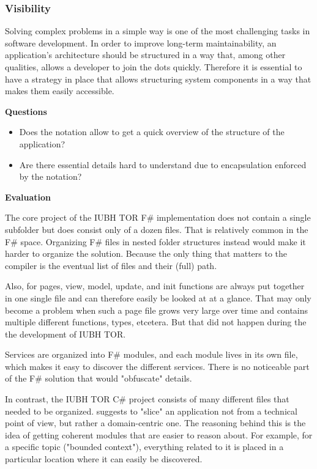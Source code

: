 \subsubsection{Visibility}

Solving complex problems in a simple way is one of the most challenging tasks in software development. In order to improve long-term maintainability, an application's architecture should be structured in a way that, among other qualities, allows a developer to join the dots quickly. Therefore it is essential to have a strategy in place that allows structuring system components in a way that makes them easily accessible.

\textbf{Questions}

\begin{itemize}
\item Does the notation allow to get a quick overview of the structure of the application?
\item Are there essential details hard to understand due to encapsulation enforced by the notation?
\end{itemize}

\textbf{Evaluation}

The core project of the IUBH TOR F\# implementation does not contain a single subfolder but does consist only of a dozen files. That is relatively common in the F\# space. Organizing F\# files in nested folder structures instead would make it harder to organize the solution. Because the only thing that matters to the compiler is the eventual list of files and their (full) path.

Also, for pages, view, model, update, and init functions are always put together in one single file and can therefore easily be looked at at a glance. That may only become a problem when such a page file grows very large over time and contains multiple different functions, types, etcetera. But that did not happen during the the development of IUBH TOR.

Services are organized into F\# modules, and each module lives in its own file, which makes it easy to discover the different services. There is no noticeable part of the F\# solution that would "obfuscate" details.

In contrast, the IUBH TOR C\# project consists of many different files that needed to be organized. \cite[117]{lilienthal_langlebige_2017} suggests to "slice" an application not from a technical point of view, but rather a domain-centric one. The reasoning behind this is the idea of getting coherent modules that are easier to reason about. For example, for a specific topic ("bounded context"), everything related to it is placed in a particular location where it can easily be discovered.

